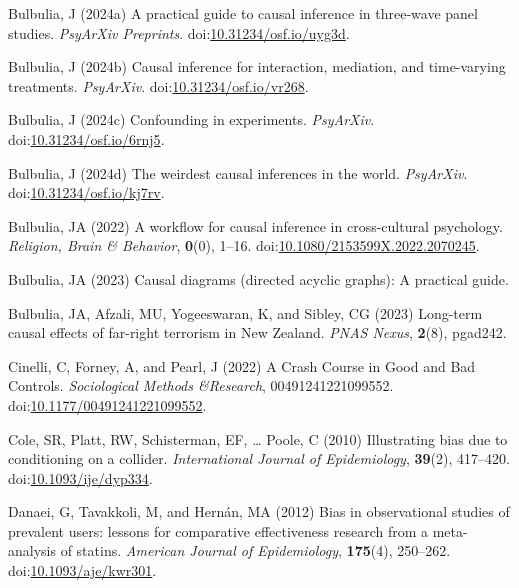 \documentclass[
  singlecolumn]{article}
\newlength{\cslhangindent}
\newenvironment{CSLReferences}[2] %
 {\begin{list}{}{%
  \setlength{\itemindent}{0pt}
  \setlength{\leftmargin}{0pt}
  \setlength{\parsep}{0pt}
  \ifodd #1
   \setlength{\leftmargin}{\cslhangindent}
   \setlength{\itemindent}{-1\cslhangindent}
  \fi
  \setlength{\itemsep}{#2\baselineskip}}}
 {\end{list}}
\begin{document}
\label{refs}
\begin{CSLReferences}{1}{0}
Bulbulia, J (2024a) A practical guide to causal inference in three-wave
panel studies. \emph{PsyArXiv Preprints}.
doi:\href{https://doi.org/10.31234/osf.io/uyg3d}{10.31234/osf.io/uyg3d}.

Bulbulia, J (2024b) Causal inference for interaction, mediation, and
time-varying treatments. \emph{PsyArXiv}.
doi:\href{https://doi.org/10.31234/osf.io/vr268}{10.31234/osf.io/vr268}.

Bulbulia, J (2024c) Confounding in experiments. \emph{PsyArXiv}.
doi:\href{https://doi.org/10.31234/osf.io/6rnj5}{10.31234/osf.io/6rnj5}.

Bulbulia, J (2024d) The weirdest causal inferences in the world.
\emph{PsyArXiv}.
doi:\href{https://doi.org/10.31234/osf.io/kj7rv}{10.31234/osf.io/kj7rv}.

Bulbulia, JA (2022) A workflow for causal inference in cross-cultural
psychology. \emph{Religion, Brain \& Behavior}, \textbf{0}(0), 1--16.
doi:\href{https://doi.org/10.1080/2153599X.2022.2070245}{10.1080/2153599X.2022.2070245}.

Bulbulia, JA (2023) Causal diagrams (directed acyclic graphs): A
practical guide.

Bulbulia, JA, Afzali, MU, Yogeeswaran, K, and Sibley, CG (2023)
Long-term causal effects of far-right terrorism in {N}ew {Z}ealand.
\emph{PNAS Nexus}, \textbf{2}(8), pgad242.

Cinelli, C, Forney, A, and Pearl, J (2022) A Crash Course in Good and
Bad Controls. \emph{Sociological Methods \&Research}, 00491241221099552.
doi:\href{https://doi.org/10.1177/00491241221099552}{10.1177/00491241221099552}.

Cole, SR, Platt, RW, Schisterman, EF, \ldots{} Poole, C (2010)
Illustrating bias due to conditioning on a collider. \emph{International
Journal of Epidemiology}, \textbf{39}(2), 417--420.
doi:\href{https://doi.org/10.1093/ije/dyp334}{10.1093/ije/dyp334}.

Danaei, G, Tavakkoli, M, and Hernán, MA (2012) Bias in observational
studies of prevalent users: lessons for comparative effectiveness
research from a meta-analysis of statins. \emph{American Journal of
Epidemiology}, \textbf{175}(4), 250--262.
doi:\href{https://doi.org/10.1093/aje/kwr301}{10.1093/aje/kwr301}.


\end{CSLReferences}
\end{document}
